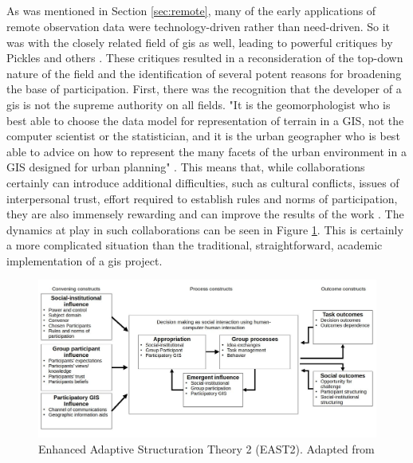 \subsection{} \label{sec:collaborative}

As was mentioned in Section \ref{sec:remote}, many of the early applications of remote observation data were technology-driven rather than need-driven. So it was with the closely related field of \ac{gis} as well, leading to powerful critiques by Pickles and others \cite{picklesGroundTruthSocial1994}. These critiques resulted in a reconsideration of the top-down nature of the field and the identification of several potent reasons for broadening the base of participation. First, there was the recognition that the developer of a \ac{gis} is not the supreme authority on all fields. "It is the geomorphologist who is best able to choose the data model for representation of terrain in a GIS, not the computer scientist or the statistician, and it is the urban geographer who is best able to advice on how to represent the many facets of the urban environment in a GIS designed for urban planning" \cite{goodchildGeographicInformationSystems1994}. This means that, while collaborations certainly can introduce additional difficulties, such as cultural conflicts, issues of interpersonal trust, effort required to establish rules and norms of participation, they are also immensely rewarding and can improve the results of the work \cite{tullochInstitutionalGeographicInformation2007}. The dynamics at play in such collaborations can be seen in Figure \ref{fig:east2}. This is certainly a more complicated situation than the traditional, straightforward, academic implementation of a \ac{gis} project.

\begin{figure}[h]
	\centering
	\includegraphics[scale=0.4]{Figures/chap2/east2.jpg}
	\caption[Enhanced Adaptive Structuration Theory 2 (EAST2)]{Enhanced Adaptive Structuration Theory 2 (EAST2). Adapted from \cite{jankowskiGISGroupDecision2001}}
	\label{fig:east2}
\end{figure}

